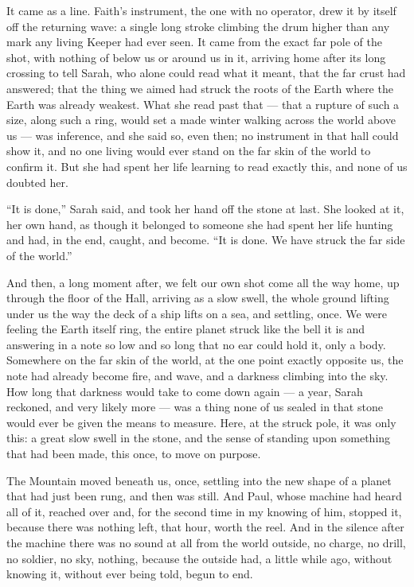 It came as a line. Faith's instrument, the one with no operator, drew it by itself off the returning wave: a single long stroke climbing the drum higher than any mark any living Keeper had ever seen. It came from the exact far pole of the shot, with nothing of below us or around us in it, arriving home after its long crossing to tell Sarah, who alone could read what it meant, that the far crust had answered; that the thing we aimed had struck the roots of the Earth where the Earth was already weakest. What she read past that --- that a rupture of such a size, along such a ring, would set a made winter walking across the world above us --- was inference, and she said so, even then; no instrument in that hall could show it, and no one living would ever stand on the far skin of the world to confirm it. But she had spent her life learning to read exactly this, and none of us doubted her.\par

``It is done,'' Sarah said, and took her hand off the stone at last. She looked at it, her own hand, as though it belonged to someone she had spent her life hunting and had, in the end, caught, and become. ``It is done. We have struck the far side of the world.''\par

And then, a long moment after, we felt our own shot come all the way home, up through the floor of the Hall, arriving as a slow swell, the whole ground lifting under us the way the deck of a ship lifts on a sea, and settling, once. We were feeling the Earth itself ring, the entire planet struck like the bell it is and answering in a note so low and so long that no ear could hold it, only a body. Somewhere on the far skin of the world, at the one point exactly opposite us, the note had already become fire, and wave, and a darkness climbing into the sky. How long that darkness would take to come down again --- a year, Sarah reckoned, and very likely more --- was a thing none of us sealed in that stone would ever be given the means to measure. Here, at the struck pole, it was only this: a great slow swell in the stone, and the sense of standing upon something that had been made, this once, to move on purpose.\par

The Mountain moved beneath us, once, settling into the new shape of a planet that had just been rung, and then was still. And Paul, whose machine had heard all of it, reached over and, for the second time in my knowing of him, stopped it, because there was nothing left, that hour, worth the reel. And in the silence after the machine there was no sound at all from the world outside, no charge, no drill, no soldier, no sky, nothing, because the outside had, a little while ago, without knowing it, without ever being told, begun to end.\par
